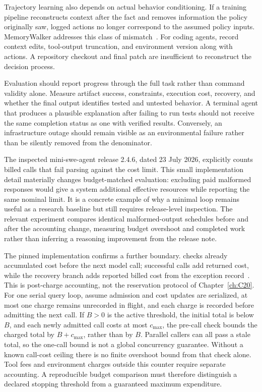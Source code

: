 Trajectory learning also depends on actual behavior conditioning. If a training pipeline reconstructs context after the fact and removes information the policy originally saw, logged actions no longer correspond to the assumed policy inputs. MemoryWalker addresses this class of mismatch~\cite{j2026memorywalker}. For coding agents, record context edits, tool-output truncation, and environment version along with actions. A repository checkout and final patch are insufficient to reconstruct the decision process.

Evaluation should report progress through the full task rather than command validity alone. Measure artifact success, constraints, execution cost, recovery, and whether the final output identifies tested and untested behavior. A terminal agent that produces a plausible explanation after failing to run tests should not receive the same completion status as one with verified results. Conversely, an infrastructure outage should remain visible as an environmental failure rather than be silently removed from the denominator.


The inspected mini-swe-agent release 2.4.6, dated 23 July 2026, explicitly counts billed calls that fail parsing against the cost limit\cite{executionrelease08}. This small implementation detail materially changes budget-matched evaluation: excluding paid malformed responses would give a system additional effective resources while reporting the same nominal limit. It is a concrete example of why a minimal loop remains useful as a research baseline but still requires release-level inspection. The relevant experiment compares identical malformed-output schedules before and after the accounting change, measuring budget overshoot and completed work rather than inferring a reasoning improvement from the release note.

The pinned implementation confirms a further boundary.  checks already accumulated cost before the next model call; successful calls add returned cost, while the  recovery branch adds reported billed cost from the exception record~\cite{cumb2026minisweloop}. This is post-charge accounting, not the reservation protocol of Chapter~\ref{ch:C20}. For one serial query loop, assume admission and cost updates are serialized, at most one charge remains unrecorded in flight, and each charge is recorded before admitting the next call. If $B>0$ is the active threshold, the initial total is below $B$, and each newly admitted call costs at most $c_{\max}$, the pre-call check bounds the charged total by $B+c_{\max}$, rather than by $B$. Parallel callers can all pass a stale total, so the one-call bound is not a global concurrency guarantee. Without a known call-cost ceiling there is no finite overshoot bound from that check alone. Tool fees and environment charges outside this counter require separate accounting. A reproducible budget comparison must therefore distinguish a declared stopping threshold from a guaranteed maximum expenditure.
